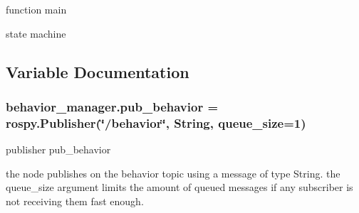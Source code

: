 function main 

state machine 

\subsection{Variable Documentation}
\subsubsection[{\texorpdfstring{pub\+\_\+behavior}{pub_behavior}}]{\setlength{\rightskip}{0pt plus 5cm}behavior\+\_\+manager.\+pub\+\_\+behavior = rospy.\+Publisher(\char`\"{}/behavior\char`\"{}, String, queue\+\_\+size=1)}\hypertarget{namespacebehavior__manager_ac30069bca00035c62a13df72bf29a3aa}{}\label{namespacebehavior__manager_ac30069bca00035c62a13df72bf29a3aa}


publisher pub\+\_\+behavior 

the node publishes on the behavior topic using a message of type String. the queue\+\_\+size argument limits the amount of queued messages if any subscriber is not receiving them fast enough. 